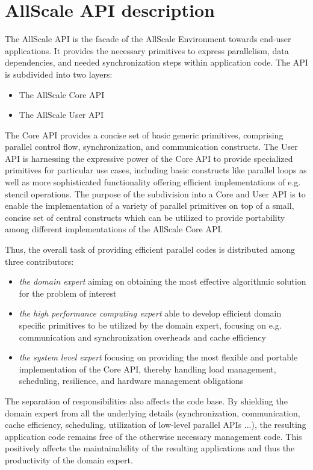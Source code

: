 \documentclass[acmsmall,review,anonymous]{acmart}\settopmatter{printfolios=true,printccs=false,printacmref=false}
\begin{document}
\section{AllScale API description}
\label{sec:API}
The AllScale API is the facade of the AllScale Environment towards end-user applications. It provides the necessary primitives to express parallelism, data dependencies, and needed synchronization steps within application code. The
API is subdivided into two layers:
\begin{itemize}
\item The AllScale Core API
\item The AllScale User API
\end{itemize}
The Core API provides a concise set of basic generic primitives, comprising
parallel control flow, synchronization, and communication constructs. The User
API is harnessing the expressive power of the Core API to provide specialized
primitives for particular use cases, including basic constructs like parallel loops
as well as more sophisticated functionality offering efficient implementations of
e.g. stencil operations.
The purpose of the subdivision into a Core and User API is to enable the
implementation of a variety of parallel primitives on top of a small, concise set of
central constructs which can be utilized to provide portability among different
implementations of the AllScale Core API.

Thus, the overall task of
providing efficient parallel codes is distributed among three contributors:
\begin{itemize}
\item \textit{the domain expert} aiming on obtaining the most effective algorithmic solution for the problem of interest
\item \textit{the high performance computing expert} able to develop efficient domain specific primitives to be utilized by the domain expert, focusing on e.g. communication and synchronization overheads and cache efficiency
\item \textit{the system level expert} focusing on providing the most flexible and portable implementation of the Core API, thereby handling load management, scheduling, resilience, and hardware management obligations
\end{itemize}

The separation of responsibilities also affects the code base. By shielding the
domain expert from all the underlying details (synchronization, communication,
cache efficiency, scheduling, utilization of low-level parallel APIs ...), the
resulting application code remains free of the otherwise necessary management
code. This positively affects the maintainability of the resulting applications and
thus the productivity of the domain expert.
\end{document}
